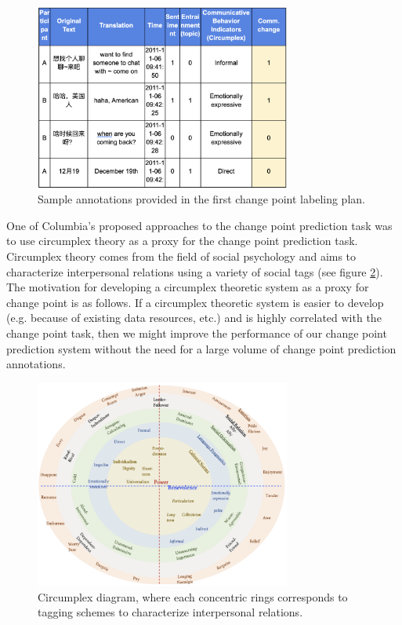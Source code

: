 \documentclass[12pt]{article}
\begin{document}
\begin{figure}[H]
    \centering
    \includegraphics[width=0.75\textwidth]{sample_annotations.png}
    \caption{Sample annotations provided in the first change point labeling plan.}
    \label{fig:sample_annotations}
\end{figure}

One of Columbia's proposed approaches to the change point prediction task was to use circumplex theory as a proxy for the change point prediction task. Circumplex theory comes from the field of social psychology and aims to characterize interpersonal relations using a variety of social tags (see figure \ref{fig:circumplex}). The motivation for developing a circumplex theoretic system as a proxy for change point is as follows. If a circumplex theoretic system is easier to develop (e.g. because of existing data resources, etc.) and is highly correlated with the change point task, then we might improve the performance of our change point prediction system without the need for a large volume of change point prediction annotations.

\begin{figure}[H]
    \centering
    \includegraphics[width=0.75\textwidth]{circumplex.png}
    \caption{Circumplex diagram, where each concentric rings corresponds to tagging schemes to characterize interpersonal relations.}
    \label{fig:circumplex}
\end{figure}
\end{document}
